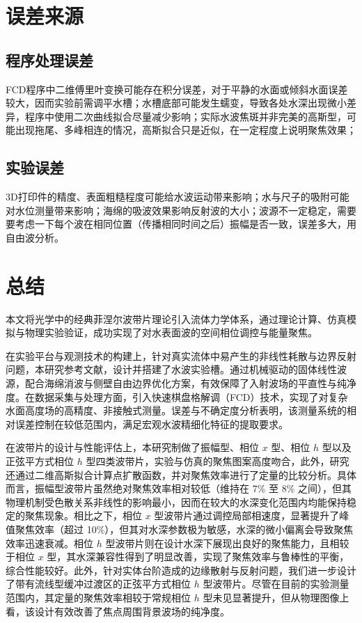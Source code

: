 \documentclass[11pt,a4paper]{ctexart}
\begin{document}
\section{误差来源}

\subsection{程序处理误差}

FCD程序中二维傅里叶变换可能存在积分误差，对于平静的水面或倾斜水面误差较大，因而实验前需调平水槽；水槽底部可能发生蠕变，导致各处水深出现微小差异，程序中使用二次曲线拟合尽量减少影响；实际水波焦斑并非完美的高斯型，可能出现拖尾、多峰相连的情况，高斯拟合只是近似，在一定程度上说明聚焦效果；

\subsection{实验误差}
3D打印件的精度、表面粗糙程度可能给水波运动带来影响；水与尺子的吸附可能对水位测量带来影响；海绵的吸波效果影响反射波的大小；波源不一定稳定，需要要考虑一下每个波在相同位置（传播相同时间之后）振幅是否一致，误差多大，用自由波分析。


\section{总结}
本文将光学中的经典菲涅尔波带片理论引入流体力学体系，通过理论计算、仿真模拟与物理实验验证，成功实现了对水表面波的空间相位调控与能量聚焦。

在实验平台与观测技术的构建上，针对真实流体中易产生的非线性耗散与边界反射问题，本研究参考文献\cite{Wang2024}，设计并搭建了水波实验槽。通过机械驱动的固体线性波源，配合海绵消波与侧壁自由边界优化方案，有效保障了入射波场的平直性与纯净度。在数据采集与处理方面，引入快速棋盘格解调（FCD）技术，实现了对复杂水面高度场的高精度、非接触式测量。误差与不确定度分析表明，该测量系统的相对误差控制在较低范围内，满足宏观水波精细化特征的提取要求。

在波带片的设计与性能评估上，本研究制做了振幅型、相位 $x$ 型、相位 $h$ 型以及正弦平方式相位 $h$ 型四类波带片，实验与仿真的聚焦图案高度吻合，此外，研究还通过二维高斯拟合计算点扩散函数，并对聚焦效率进行了定量的比较分析。具体而言，振幅型波带片虽然绝对聚焦效率相对较低（维持在 7\% 至 8\% 之间），但其物理机制受色散关系非线性的影响最小，因而在较大的水深变化范围内均能保持稳定的聚焦现象。相比之下，相位 $x$ 型波带片通过调控局部相速度，显著提升了峰值聚焦效率（超过 10\%），但其对水深参数极为敏感，水深的微小偏离会导致聚焦效率迅速衰减。相位 $h$ 型波带片则在设计水深下展现出良好的聚焦能力，且相较于相位 $x$ 型，其水深兼容性得到了明显改善，实现了聚焦效率与鲁棒性的平衡，综合性能较好。此外，针对实体台阶造成的边缘散射与反射问题，我们进一步设计了带有流线型缓冲过渡区的正弦平方式相位 $h$ 型波带片。尽管在目前的实验测量范围内，其定量的聚焦效率相较于常规相位 $h$ 型未见显著提升，但从物理图像上看，该设计有效改善了焦点周围背景波场的纯净度。
\end{document}
